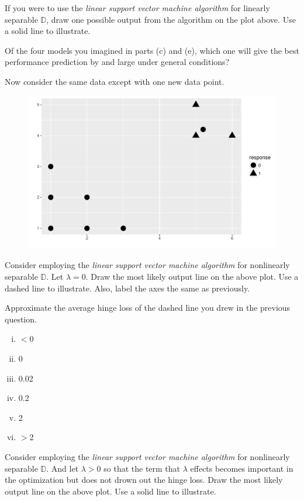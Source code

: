 \documentclass[12pt]{article}
\begin{document}
 If you were to use the \emph{linear support vector machine algorithm} for linearly separable $\mathbb{D}$, draw one possible output from the algorithm on the plot above. Use a solid line to illustrate.


 Of the four models you imagined in parts (c) and (e), which one will give the best performance prediction by and large under general conditions?
\pagebreak

Now consider the same data except with one new data point.


\begin{figure}[htp]
\centering
\includegraphics[width=5.7in]{nonlinsep}
\end{figure}

 Consider employing the \emph{linear support vector machine algorithm} for nonlinearly separable $\mathbb{D}$. Let $\lambda = 0$. Draw the most likely output line on the above plot. Use a dashed line to illustrate. Also, label the axes the same as previously. 

 Approximate the average hinge loss of the dashed line you drew in the previous question.

\begin{enumerate}[i)]
\item $<0$
\item 0
\item 0.02
\item 0.2
\item 2
\item $>$2
\end{enumerate}

 Consider employing the \emph{linear support vector machine algorithm} for nonlinearly separable $\mathbb{D}$. And let $\lambda > 0$ so that the term that $\lambda$ effects becomes important in the optimization but does not drown out the hinge loss. Draw the most likely output line on the above plot. Use a solid line to illustrate.
\end{document}
